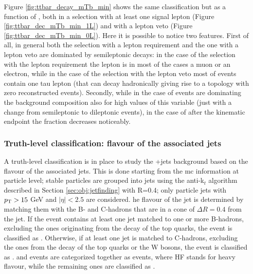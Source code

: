 Figure \ref{fig:ttbar_decay_mTb_min} shows the same \ttbar classification but as a function of \mtb, both in a selection with at least one signal lepton (Figure \ref{fig:ttbar_dec_mTb_min_1L}) and with a lepton veto (Figure \ref{fig:ttbar_dec_mTb_min_0L}). Here it is possible to notice two features. First of all, in general both the selection with a lepton requirement and the one with a lepton veto are dominated by semileptonic decays: in the case of the selection with the lepton requirement the lepton is in most of the cases a muon or an electron, while in the case of the selection with the lepton veto most of events contain one tau lepton (that can decay hadronically giving rise to a topology with zero reconstructed events).
Secondly, while in the case of \mt \ttbar events are dominating the background composition also for high values of this variable (just with a change from semileptonic to dileptonic \ttbar events), in the case of \mtb after the kinematic endpoint the \ttbar fraction decreases noticeably. 




\subsubsection*{Truth-level classification: flavour of the associated jets}

A truth-level classification is in place to study the \ttbar+jets background based on the flavour of the associated jets.
This is done starting from the \gls{mc} information at particle level; stable particles are grouped into jets using the anti-k$_t$ algorithm 
described in Section \ref{sec:obj:jetfinding} with R=0.4; only particle jets with $p_{\rm T} > 15$ GeV and $|\eta|<2.5$ are considered. 
he flavour of the jet is determined by matching them with the B- and C-hadrons that are in a cone of $\Delta R = 0.4$ from the jet. 
If the event contains at least one jet matched to one or more B-hadrons, excluding the ones originating from the decay of the top quarks, the event 
is classified as \ttbb. Otherwise, if at least one jet is matched to C-hadrons, excluding the ones from the decay of the top quarks or the W bosons, the event is classified as \ttcc. \ttbb and \ttbb events are categorized together as \tthf events, where HF stands for heavy flavour, while the remaining ones are classified as \ttlight.

